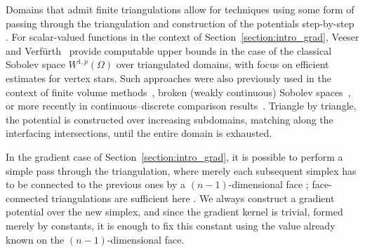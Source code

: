 \documentclass[10pt,a4paper]{article}
\newcommand\cye[1]{%
\protect\leavevmode
\begingroup
    \color{blue}%
    #1%
\endgroup
}
\begin{document}
Domains that admit finite triangulations allow for techniques \cye{using some form of passing through the triangulation and construction of the potentials step-by-step}. For scalar-valued functions in the context of Section~\ref{section:intro_grad}, Veeser and Verf\"urth~\cite{veeser2012poincare} provide computable upper bounds in the case of the classical Sobolev space $W^{1,p}(\Omega)$ over triangulated domains, with focus on efficient estimates for \cye{vertex} stars. 
Such approaches were also previously used in the context of finite volume methods~\cite{Eym_Gal_Her_00}, broken (weakly continuous) Sobolev spaces~\cite{vohralik2005discrete}, or more recently in continuous--discrete comparison results~\cite{Brae_Pill_Sch_p_rob_09, ern2020stable, Chaum_Voh_p_rob_3D_H_curl_24,  Voh_loc_glob_H1_24}. Triangle by triangle, the potential is constructed over increasing subdomains, matching along the interfacing intersections, until the entire domain is exhausted.  

In the gradient case of Section~\ref{section:intro_grad}, it is possible to perform a simple pass through the triangulation, where merely each subsequent simplex has to be connected to the previous ones by a $(n-1)$-dimensional face\cye{; face-connected triangulations are sufficient here}. We always construct a gradient potential over the new simplex, and since the gradient kernel is trivial, formed merely by constants, it is enough to fix this constant using the value already known on the $(n-1)$-dimensional face.

\end{document}
